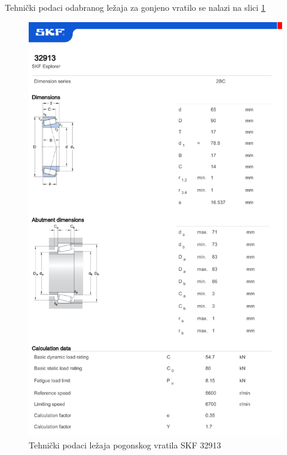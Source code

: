 \documentclass[11pt,a4paper]{report}
\begin{document}
Tehnički podaci odabranog ležaja za gonjeno vratilo se nalazi na slici \ref{fig:lezajGonjenogVratila}
\begin{figure}[h]
\includegraphics[width=1\textwidth]{datasheetsModels/Tapered_roller_bearings_single_row-32913.pdf}
\caption{Tehnički podaci ležaja pogonskog vratila SKF 32913}\label{fig:lezajGonjenogVratila}
\end{figure}


\newpage
\nocite{*}


\newpage
\appendix
{}



\end{document}
